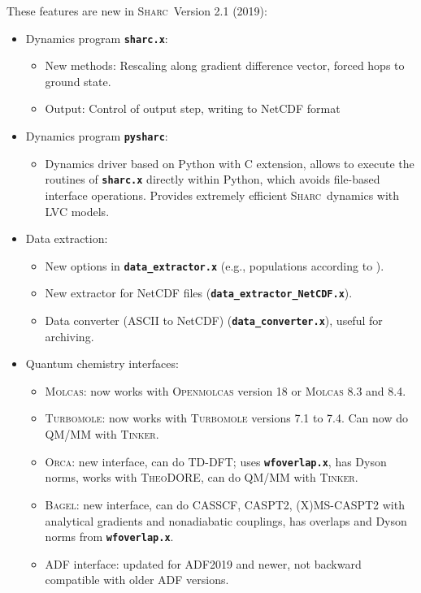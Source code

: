 \documentclass[a4paper,10pt,DIV=15,openany]{scrbook}
\newcommand{\sharc}{\textsc{Sharc}}
\newcommand{\ttt}[1]{\textbf{\texttt{#1}}}
\begin{document}
These features are new in \sharc\ Version 2.1 (2019):
\begin{itemize}
  \item Dynamics program \ttt{sharc.x}:
  \begin{itemize}
    \item New methods: Rescaling along gradient difference vector, forced hops to ground state.
    \item Output: Control of output step, writing to NetCDF format
  \end{itemize}
  \item Dynamics program \ttt{pysharc}:
  \begin{itemize}
    \item Dynamics driver based on Python with C extension, allows to execute the routines of \ttt{sharc.x} directly within Python, which avoids file-based interface operations. Provides extremely efficient \sharc\ dynamics with LVC models.
  \end{itemize}
  \item Data extraction:
  \begin{itemize}
    \item New options in \ttt{data\_extractor.x} (e.g., populations according to \cite{Landry2013JCP}).
    \item New extractor for NetCDF files (\ttt{data\_extractor\_NetCDF.x}).
    \item Data converter (ASCII to NetCDF) (\ttt{data\_converter.x}), useful for archiving.
  \end{itemize}
  \item Quantum chemistry interfaces:
  \begin{itemize}
    \item \textsc{Molcas}: now works with \textsc{Openmolcas} version 18 or \textsc{Molcas} 8.3 and 8.4.
    \item \textsc{Turbomole}: now works with \textsc{Turbomole} versions 7.1 to 7.4. Can now do QM/MM with \textsc{Tinker}.
    \item \textsc{Orca}: new interface, can do TD-DFT; uses \ttt{wfoverlap.x}, has Dyson norms, works with \textsc{TheoDORE}, can do QM/MM with \textsc{Tinker}.
    \item \textsc{Bagel}: new interface, can do CASSCF, CASPT2, (X)MS-CASPT2 with analytical gradients and nonadiabatic couplings, has overlaps and Dyson norms from \ttt{wfoverlap.x}.
    \item ADF interface: updated for ADF2019 and newer, not backward compatible with older ADF versions.

\end{itemize}
\end{itemize}
\end{document}
